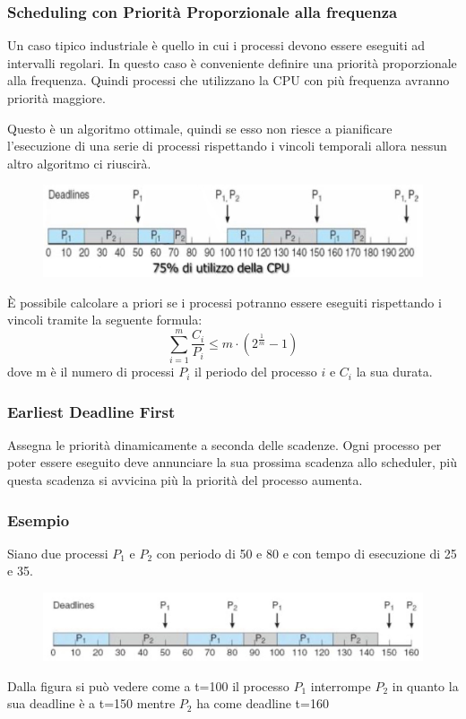 \subsubsection{Scheduling con Priorità Proporzionale alla frequenza}
Un caso tipico industriale è quello in cui i processi devono essere eseguiti ad intervalli regolari. In questo caso è conveniente definire una priorità proporzionale alla frequenza. Quindi processi che utilizzano la CPU con più frequenza avranno priorità maggiore.

\spacer
Questo è un algoritmo ottimale, quindi se esso non riesce a pianificare l'esecuzione di una serie di processi rispettando i vincoli temporali allora nessun altro algoritmo ci riuscirà.
\begin{figure}[H]
    \centering
    \includegraphics[width=0.6\linewidth]{assets/coda-frequenza.jpg}
\end{figure}

È possibile calcolare a priori se i processi potranno essere eseguiti rispettando i vincoli tramite la seguente formula:
$$\sum_{i=1}^{m}\frac{C_i}{P_i} \le m\cdot(2^{\frac{1}{m}} - 1)$$
dove m è il numero di processi $P_i$ il periodo del processo $i$ e $C_i$ la sua durata.

\subsubsection{Earliest Deadline First}
Assegna le priorità dinamicamente a seconda delle scadenze. Ogni processo per poter essere eseguito deve annunciare la sua prossima scadenza allo scheduler, più questa scadenza si avvicina più la priorità del processo aumenta.

\subsubsection{Esempio}
Siano due processi $P_1$ e $P_2$ con periodo di 50 e 80 e con tempo di esecuzione di 25 e 35.
\begin{figure}[H]
    \centering
    \includegraphics[width=0.6\linewidth]{assets/edf.jpg}
\end{figure}
Dalla figura si può vedere come a t=100 il processo $P_1$ interrompe $P_2$ in quanto la sua deadline è a t=150 mentre $P_2$ ha come deadline t=160
